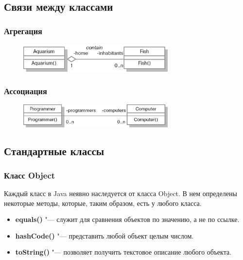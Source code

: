 \documentclass[default]{beamer}
\begin{document}
	\subsection{Связи между классами}
	\begin{frame}
		\frametitle{Агрегация}
		
		\begin{figure}
			\includegraphics[width=0.7\textwidth]{agregation}
		\end{figure}
		\lstAgregation
	\end{frame}

	\begin{frame}
		\frametitle{Ассоциация}
		
		\begin{figure}
			\includegraphics[width=0.7\textwidth]{association}
		\end{figure}
		\lstAssociation
	\end{frame}	

	\subsection{Стандартные классы}
	\begin{frame}
		\frametitle{Класс Object}
		Каждый класс в Java неявно наследуется от класса Object. В нем определены некоторые методы, которые, таким образом, есть у любого класса.
		\begin{itemize}
			\item \textbf{equals()} "--- служит для сравнения объектов по значению, а не по ссылке.
			\item \textbf{hashCode()} "--- представить любой объект целым числом.
			\item \textbf{toString()} "--- позволяет получить текстовое описание любого объекта.
		\end{itemize}
		\lstObject
	\end{frame}
\end{document}
